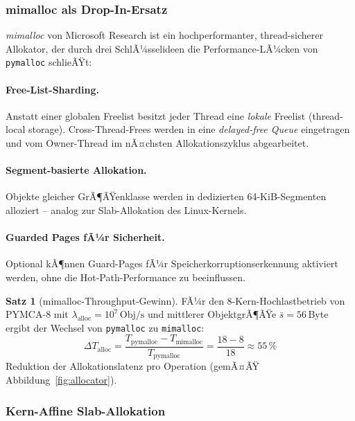 ﻿\documentclass[a4paper,12pt]{scrreprt}
\theoremstyle{definition}
\newtheorem{satz}{Satz}[section]
\begin{document}
	\subsubsection{mimalloc als Drop-In-Ersatz}
	
	\emph{mimalloc} \cite{mimalloc2019} von Microsoft Research ist ein
	hochperformanter, thread-sicherer Allokator, der durch drei
	SchlÃ¼sselideen die Performance-LÃ¼cken von \texttt{pymalloc} schlieÃŸt:
	
	\paragraph{Free-List-Sharding.}
	Anstatt einer globalen Freelist besitzt jeder Thread eine
	\emph{lokale} Freelist (thread-local storage). Cross-Thread-Frees
	werden in eine \emph{delayed-free Queue} eingetragen und vom
	Owner-Thread im nÃ¤chsten Allokationszyklus abgearbeitet.
	
	\paragraph{Segment-basierte Allokation.}
	Objekte gleicher GrÃ¶ÃŸenklasse werden in dedizierten 64-KiB-Segmenten
	alloziert -- analog zur Slab-Allokation des Linux-Kernels.
	
	\paragraph{Guarded Pages fÃ¼r Sicherheit.}
	Optional kÃ¶nnen Guard-Pages fÃ¼r Speicherkorruptionserkennung
	aktiviert werden, ohne die Hot-Path-Performance zu beeinflussen.
	
	\begin{satz}[mimalloc-Throughput-Gewinn]
		\label{satz:mimalloc_gain}
		FÃ¼r den 8-Kern-Hochlastbetrieb von PYMCA-8 mit
		$\lambda_{\mathrm{alloc}} = 10^7\,\mathrm{Obj/s}$ und
		mittlerer ObjektgrÃ¶ÃŸe $\bar{s} = 56$\,Byte ergibt der
		Wechsel von \texttt{pymalloc} zu \texttt{mimalloc}:
		\[
		\Delta T_{\mathrm{alloc}} = \frac{T_{\mathrm{pymalloc}} -
			T_{\mathrm{mimalloc}}}{T_{\mathrm{pymalloc}}}
		= \frac{18 - 8}{18} \approx 55\,\%
		\]
		Reduktion der Allokationslatenz pro Operation (gemÃ¤ÃŸ
		Abbildung~\ref{fig:allocator}).
	\end{satz}
	
	\subsubsection{Kern-Affine Slab-Allokation}
	
\end{document}
